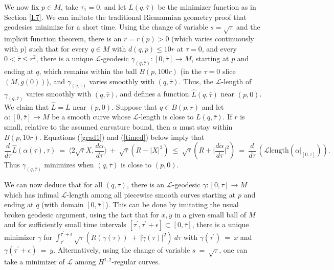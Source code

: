 \documentclass[12pt]{amsart}
\newcommand{\ra}{\rightarrow}
\numberwithin{equation}{section}
\theoremstyle{plain}
\theoremstyle{definition}
\theoremstyle{remark}
\begin{document}
We now fix $p\in M$, take $\tau_1=0$, and let $L(q,\bar\tau)$ be the
minimizer function as in Section \ref{I.7}.
We can imitate the traditional Riemannian geometry proof that geodesics
minimize for a short time.
Using the change of variable $s = \sqrt{\tau}$
and the implicit function theorem,  
there is an $r=r(p)>0$ (which varies continuously with $p$) such that
for every $q\in M$ with $d(q,p)\leq 10r$ at $\tau=0$, and every 
$0<\bar\tau\leq r^2$,
there is a unique ${\mathcal L}$-geodesic 
$\gamma_{(q,\bar\tau)}:[0,\bar\tau]\ra M$,
starting at $p$ and ending at $q$, which remains within the ball $B(p,100r)$
(in the $\tau=0$ slice $(M,g(0))$),
and $\gamma_{(q,\bar\tau)}$ varies smoothly with $(q,\bar\tau)$.
Thus, the ${\mathcal L}$-length of $\gamma_{(q,\bar\tau)}$ varies smoothly
with $(q,\bar\tau)$, and defines a function $\hat L(q,\bar\tau)$ near $(p,0)$.
We claim that $\hat L = L$ near $(p, 0)$. 
Suppose that $q \in B(p,r)$ and let $\alpha : [0, \bar \tau]
\rightarrow M$ be a smooth curve whose ${\mathcal L}$-length is
close to $L(q,\bar\tau)$. If $r$ is small, relative to the
assumed curvature bound, then $\alpha$ must stay within
$B(p, 10r)$. Equations
(\ref{grad1}) and (\ref{timed}) below imply that
\begin{equation}
\frac{d}{d\tau} \hat{L}(\alpha(\tau), \tau) \: = \:
\langle 2 \sqrt{\tau} X, \frac{d\alpha}{d\tau} \rangle \: + \: 
\sqrt{\tau} (R - |X|^2) \: \le \:
\sqrt{\tau} \left( R + \Big| \frac{d\alpha}{d\tau} \Big|^2 \right) \: = \: 
\frac{d}{d\tau} \: \left(
{\mathcal L} \text{length}(\alpha \big|_{[0, \tau]}) \right).
\end{equation}
Thus
$\gamma_{(q, \bar \tau)}$ minimizes when $(q, \bar \tau)$ is close to
$(p, 0)$.


We can now deduce that for all $(q,\bar\tau)$, there is an 
${\mathcal L}$-geodesic
$\gamma:[0,\bar\tau]\ra M$ which has infimal ${\mathcal L}$-length
among all piecewise smooth curves starting at $p$ and ending at $q$
(with domain $[0,\bar\tau]$).  This can be done by  imitating the 
usual broken geodesic argument, using the fact that 
for $x,y$ in a given small ball of $M$ and
for sufficiently
small time intervals $[\tau^\prime, \tau^\prime+\epsilon] \subset 
[0, \overline{\tau}]$, there is a unique
minimizer $\gamma$ for $\int_{\tau^\prime}^{\tau^\prime+\epsilon}
\sqrt{\tau} \left( R(\gamma(\tau)) \: +\: \left| \dot{\gamma}(\tau)
\right|^2 \right) \: d\tau$ with 
$\gamma(\tau^\prime) \: = \: x$ and
$\gamma(\tau^\prime+\epsilon) \: = \: y$. Alternatively, using the
change of variable $s \: = \: \sqrt{\tau}$, one can
take a minimizer of ${\mathcal L}$ among $H^{1,2}$-regular curves.
\end{document}
